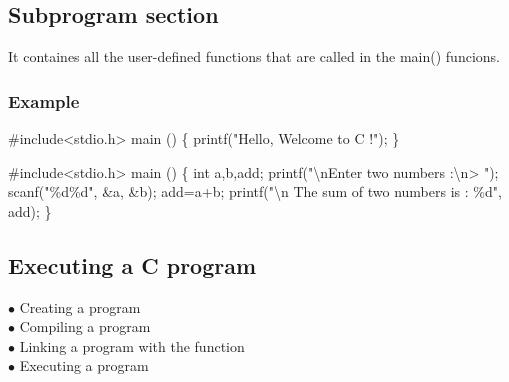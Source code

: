 \documentclass{article}
\begin{document}
	\subsection{Subprogram section}
	It containes all the user-defined functions that are called in the {\code main()} funcions.
	
	\subsubsection{Example}
	{
		\code \tabto{0.5cm} \#include<stdio.h>
		\tabto{0.5cm} main () \{
			\tabto{1cm} printf("Hello, Welcome to C !");
		\tabto{0.5cm} \}
	}

	{
		\tabto{0.5cm} \code \#include<stdio.h>
		\tabto{0.5cm} main () \{
			\tabto{1cm} int a,b,add;
			\tabto{1cm} printf("\textbackslash nEnter two numbers :\textbackslash n> ");
			\tabto{1cm} scanf("\%d\%d", \&a, \&b);
			\tabto{1cm} add=a+b;
			\tabto{1cm} printf("\textbackslash n The sum of two numbers is : \%d", add);
		\tabto{0.5cm} \}
	}

	\subsection{Executing a C program}
	$ \bullet $ Creating a program \\
	$ \bullet $ Compiling a program \\
	$ \bullet $ Linking a program with the function \\
	$ \bullet $ Executing a program
\end{document}
